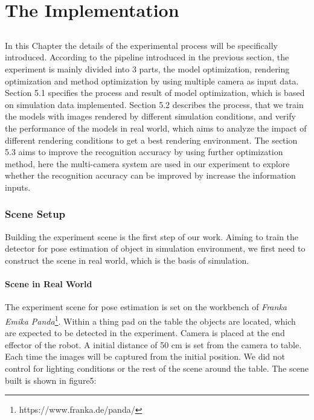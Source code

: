 \part{The Implementation}
\chapter{}
\label{sec:implementation}
In this Chapter the details of the experimental process will be specifically introduced. According to the pipeline introduced in the previous section, the experiment is mainly divided into 3 parts, the model optimization, rendering optimization and method optimization by using multiple camera as input data. Section 5.1 specifies the process and result of model optimization, which is based on simulation data implemented. Section 5.2 describes the process, that we train the models with images rendered by different simulation conditions, and verify the performance of the models in real world, which aims to analyze the impact of different rendering conditions to get a best rendering environment. The section 5.3 aims to improve the recognition accuracy by using further optimization method, here the multi-camera system are used in our experiment to explore whether the recognition accuracy can be improved by increase the information inputs.

\section{Scene Setup}
Building the experiment scene is the first step of our work. Aiming to train the detector for pose estimation of object in simulation environment, we first need to construct the scene in real world, which is the basis of simulation. 

\subsection{Scene in Real World}
The experiment scene for pose estimation is set on the workbench of \textit{Franka Emika Panda}\footnote{https://www.franka.de/panda/}. Within a thing pad on the table the objects are located, which are expected to be detected in the experiment. Camera is placed at the end effector of the robot. A initial distance of 50 cm is set from the camera to table. Each time the images will be captured from the initial position. We did not control for lighting conditions or the rest of the scene around the table. The scene built is shown in figure5:


